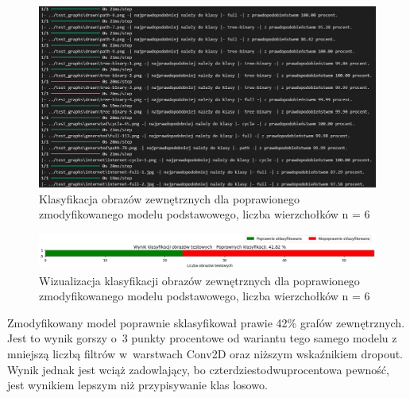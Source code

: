 \begin{figure}[ht]
	\centering
	\includegraphics[width=14cm]{resources/tests/images/v4/base6_1_1_txt.png}
	\caption{Klasyfikacja obrazów zewnętrznych dla poprawionego zmodyfikowanego modelu podstawowego, liczba wierzchołków n = 6}
	\label{Fig:tests-best-2b}
\end{figure}
\FloatBarrier

\begin{figure}[ht]
	\centering
	\includegraphics[width=14cm]{resources/tests/images/v4/base6_1_1_bar.png}
	\caption{Wizualizacja klasyfikacji obrazów zewnętrznych dla poprawionego zmodyfikowanego modelu podstawowego, liczba wierzchołków n = 6}
	\label{Fig:tests-best-1c}
\end{figure}
\FloatBarrier

Zmodyfikowany model poprawnie sklasyfikował prawie 42\% grafów zewnętrznych.
Jest to wynik gorszy o~3 punkty procentowe od wariantu tego samego modelu
z mniejszą liczbą filtrów w~warstwach Conv2D oraz niższym wskaźnikiem dropout.
Wynik jednak jest wciąż zadowlający, bo czterdziestodwuprocentowa pewność,
jest wynikiem lepszym niż przypisywanie klas losowo.

